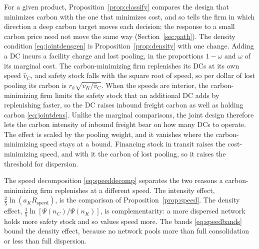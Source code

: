 \documentclass[11pt]{article}
\numberwithin{proposition}{section}
\theoremstyle{definition}
\theoremstyle{remark}
\theoremstyle{plain}
\begin{document}
\noindent For a given product, Proposition~\ref{prop:classify} compares the design that minimizes carbon with the
one that minimizes cost, and so tells the firm in which direction a deep carbon target moves each decision; the
response to a small carbon price need not move the same way (Section~\ref{sec:path}). The
density condition \eqref{eq:jointdensgen} is Proposition~\ref{prop:density} with one change. Adding a DC incurs a facility charge and lost pooling, in the proportions $1-\omega$ and $\omega$ of its marginal cost.
The carbon-minimizing firm replenishes its DCs at its own speed $\hat v_C$, and safety stock falls with the
square root of speed, so per dollar of lost pooling its carbon is $r_h\sqrt{v_K/\hat v_C}$. When the speeds are interior, the carbon-minimizing firm limits the safety stock that an additional DC adds
by replenishing faster, so the DC raises inbound freight carbon as well as holding carbon
\eqref{eq:jointdens}. Unlike the marginal comparisons, the joint design therefore lets the carbon intensity of
inbound freight bear on how many DCs to operate. The effect is scaled by the pooling weight, and it vanishes where the carbon-minimizing speed stays at a
bound. Financing stock in transit raises the
cost-minimizing speed, and with it the carbon of lost pooling, so it raises the threshold for dispersion.

\noindent The speed decomposition \eqref{eq:speeddecomp} separates the two reasons a carbon-minimizing firm
replenishes at a different speed. The intensity effect, $\tfrac25\ln(a_KR_{\mathrm{speed}})$, is the comparison of
Proposition~\ref{prop:speed}. The density effect, $\tfrac15\ln[\Psi(n_C)/\Psi(n_K)]$, is complementarity: a more
dispersed network holds more safety stock and so values speed more. The bands \eqref{eq:speedbands} bound the
density effect, because no network pools more than full consolidation or less than full dispersion. 
\end{document}
